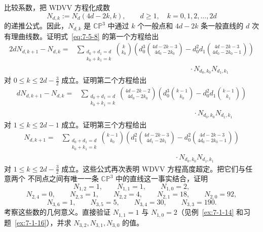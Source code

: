 \begin{exercise}
比较系数，把 WDVV 方程化成数
\[
  N_{d,k}:=N_d(4d-2k,k),
  \qquad d\ge1,\quad k=0,1,2,\ldots,2d
\]
的递推公式。因此，$N_{d,k}$ 是 $\mathbb{CP}^3$ 中通过 $k$ 个一般点和
$4d-2k$ 条一般直线的 $d$ 次有理曲线数。证明式~\eqref{eq:7-5-8} 的第一个方程给出
\begin{align*}
  2dN_{d,k+1}-N_{d,k}
  ={}&\sum_{\substack{d_0+d_1=d\\k_0+k_1=k}}
  \binom{k}{k_0}
  \left(
    d_0^3\binom{4d-2k-3}{4d_0-2k_0}
    -d_0^2d_1\binom{4d-2k-3}{4d_0-2k_0-1}
  \right)\\
  &\hspace{16em}\cdot N_{d_0,k_0}N_{d_1,k_1}
\end{align*}
对 $0\le k\le2d-\frac32$ 成立。证明第二个方程给出
\begin{align*}
  dN_{d,k+1}-N_{d,k}
  ={}&\sum_{\substack{d_0+d_1=d\\k_0+k_1=k}}
  \binom{4d-2k-2}{4d_0-2k_0}
  \left(
    d_0^3\binom{k-1}{k_0}
    -d_0^2d_1\binom{k-1}{k_1}
  \right)\\
  &\hspace{16em}\cdot N_{d_0,k_0}N_{d_1,k_1}
\end{align*}
对 $1\le k\le2d-1$ 成立。证明第三个方程给出
\begin{align*}
  N_{d,k+1}
  ={}&\sum_{\substack{d_0+d_1=d\\k_0+k_1=k}}
  \binom{k-1}{k_0}
  \left(
    d_1^2\binom{4d-2k-3}{4d_1-2k_1}
    -d_0^2\binom{4d-2k-3}{4d_0-2k_0-1}
  \right)\\
  &\hspace{16em}\cdot N_{d_0,k_0}N_{d_1,k_1}
\end{align*}
对 $1\le k\le2d-\frac32$ 成立。这些公式再次表明 WDVV 方程高度超定。把它们与任意两个
不同点之间有唯一一条 $\mathbb{CP}^3$ 中的直线这一事实结合，证明
\[
  N_{1,2}=1,\qquad N_{1,1}=1,\qquad N_{1,0}=2,
\]
\[
  N_{2,4}=0,\qquad N_{2,3}=1,\qquad N_{2,2}=4,
  \qquad N_{2,1}=18,\qquad N_{2,0}=92,
\]
\[
  N_{3,6}=1,\qquad N_{3,5}=5,\qquad N_{3,4}=30,
  \qquad N_{3,3}=190.
\]
考察这些数的几何意义。直接验证 $N_{1,1}=1$ 与 $N_{1,0}=2$（见例~\ref{ex:7-1-14}
和习题~\ref{ex:7-1-16}），并求 $N_{3,2},N_{3,1},N_{3,0}$ 的值。
\end{exercise}
